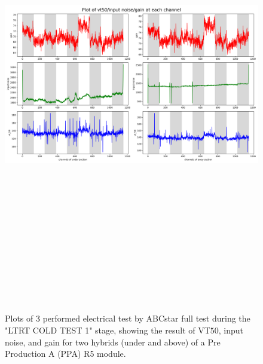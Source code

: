 \begin{figure}
    \centering
    \includegraphics[width=25cm,height=20cm,keepaspectratio]{Figures/results/LTRT_1_plot.png}
    \caption{Plots of $3$ performed electrical test by ABCstar full test during the "LTRT COLD TEST 1" stage, showing the result of VT$50$, input noise, and gain for two hybrids (under and above) of a Pre Production A (PPA) R5 module.}
    \label{fig:LTRT_result_1_large}
\end{figure}


